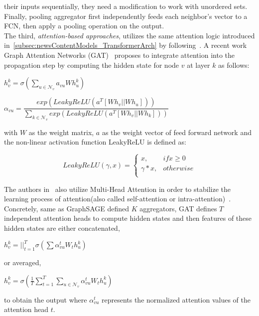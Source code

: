 their inputs sequentially, they need a modification to work with unordered sets. Finally, pooling aggregator first independently feeds each neighbor's vector to a FCN, then apply a pooling operation on the output.\\
The third, \emph{attention-based approaches}, utilizes the same attention logic introduced in~\ref{subsec:newsContentModels_TransformerArch} by following~\cite{NeuralMachineTranslationByJointlyLearning_Bahdanau}. A recent work Graph Attention Networks (GAT)~\parencite{GraphAttentionNetworks_Velickovic} proposes to integrate attention into the propagation step by computing the hidden state for node $v$ at layer $k$ as follows:
\begin{center}
    $h_v^{k} = \sigma(\sum_{u \in \mathcal{N}_v} a_{vu} W h_u^k)$ \\
\end{center}
\begin{center}
    $\alpha_{vu} = \dfrac{exp(LeakyReLU(a^T[Wh_v || Wh_u]))}{\sum_{k \in \mathcal{N}_v}exp(LeakyReLU(a^T[W h_v || W h_k]))}$
\end{center}
with $W$ as the weight matrix, $a$ as the weight vector of feed forward network and the non-linear activation function LeakyReLU is defined as:
\begin{center}
    \[LeakyReLU(\gamma, x) =
        \begin{cases}
            x,          & if x \geq 0 \\
            \gamma * x, & otherwise   \\
        \end{cases}
    \]
\end{center}
The authors in~\cite{GraphAttentionNetworks_Velickovic} also utilize Multi-Head Attention in order to stabilize the
learning process of attention(also called self-attention or intra-attention)~\parencite{AttentionIsAllYouNeed_Vaswani}. Concretely, same as GraphSAGE defined $K$ aggregators, GAT defines $T$ independent attention heads to compute hidden states and then features of these hidden states are either concatenated,
\begin{center}
    $h_v^k = ||_{t=1}^T \sigma(\sum \alpha_{vu}^t W_t h_u^k)$
\end{center}
or averaged,
\begin{center}
    $h_v^k = \sigma(\frac{1}{T} \sum_{t=1}^T \sum_{u \in \mathcal{N}_v} \alpha_{vu}^t W_t h_u^k)$
\end{center}
to obtain the output where $\alpha_{vu}^t$ represents the normalized attention values of the attention head $t$.\\
